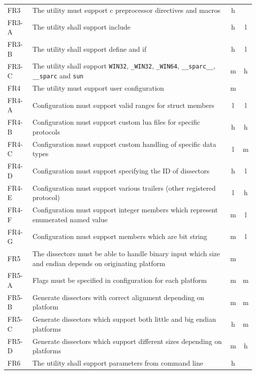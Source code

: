 \begin{table}[htbp]
{\begin{tabularx}{1.2\textwidth}{l X c c}
	\midrule
	FR3 & The \gls{utility} must support \Gls{c} \gls{preprocessor} directives and macros & \Gls{h} & \\
	FR3-A & The \gls{utility} shall support \gls{include} & \Gls{h} & \Gls{l} \\
	FR3-B & The \gls{utility} shall support \gls{define} and \gls{if} & \Gls{h} & \Gls{l} \\
	FR3-C & The \gls{utility} shall support \verb+WIN32+, \verb+_WIN32+, \verb+_WIN64+, \verb+__sparc__+, \verb+__sparc+ and \verb+sun+ & \Gls{m} & \Gls{h} \\
	\midrule
	FR4 & The \gls{utility} must support user configuration & \Gls{m} & \\
	FR4-A & Configuration must support valid ranges for \gls{struct} \glspl{member} & \Gls{l} & \Gls{l} \\
	FR4-B & Configuration must support custom \Gls{lua} files for specific \glspl{protocol} & \Gls{h} & \Gls{h} \\
	FR4-C & Configuration must support custom handling of specific data types & \Gls{l} & \Gls{m} \\
	FR4-D & Configuration must support specifying the ID of \glspl{dissector} & \Gls{h} & \Gls{l} \\
	FR4-E & Configuration must support various trailers (other registered \gls{protocol}) & \Gls{l} & \Gls{h} \\
	FR4-F & Configuration must support integer \glspl{member} which represent enumerated named value & \Gls{m} & \Gls{l} \\	
	FR4-G & Configuration must support \glspl{member} which are \gls{bit string} & \Gls{m} & \Gls{l} \\
	\midrule
	FR5 & The \glspl{dissector} must be able to handle \gls{binary} input which size and \gls{endian} depends on originating platform & \Gls{m} & \\
	FR5-A & Flags must be specified in configuration for each platform & \Gls{m} & \Gls{m} \\
	FR5-B & Generate \glspl{dissector} with correct alignment depending on platform & \Gls{m} & \Gls{m} \\
	FR5-C & Generate \glspl{dissector} which support both little and big \gls{endian} platforms & \Gls{h} & \Gls{m} \\
	FR5-D & Generate \glspl{dissector} which support different sizes depending on platforms & \Gls{m} & \Gls{h} \\
	\midrule
	FR6 & The \gls{utility} shall support parameters from command line & \Gls{h} & \\

\end{tabularx}}
\end{table}
